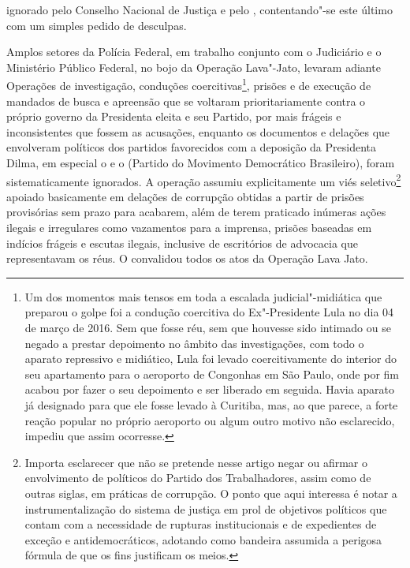 ignorado pelo Conselho Nacional de Justiça e pelo , contentando"-se
este último com um simples pedido de desculpas.

Amplos setores da Polícia Federal, em trabalho conjunto com o Judiciário
e o Ministério Público Federal, no bojo da Operação Lava"-Jato, levaram
adiante Operações de investigação, conduções coercitivas\footnote{Um dos
  momentos mais tensos em toda a escalada judicial"-midiática que
  preparou o golpe foi a condução coercitiva do Ex"-Presidente Lula no
  dia 04 de março de 2016. Sem que fosse réu, sem que houvesse sido
  intimado ou se negado a prestar depoimento no âmbito das
  investigações, com todo o aparato repressivo e midiático, Lula foi
  levado coercitivamente do interior do seu apartamento para o aeroporto
  de Congonhas em São Paulo, onde por fim acabou por fazer o seu
  depoimento e ser liberado em seguida. Havia aparato já designado para
  que ele fosse levado à Curitiba, mas, ao que parece, a forte reação
  popular no próprio aeroporto ou algum outro motivo não esclarecido,
  impediu que assim ocorresse.}, prisões e de execução de mandados de
busca e apreensão que se voltaram prioritariamente contra o próprio
governo da Presidenta eleita e seu Partido, por mais frágeis e
inconsistentes que fossem as acusações, enquanto os documentos e
delações que envolveram políticos dos partidos favorecidos com a
deposição da Presidenta Dilma, em especial o  e o  (Partido do
Movimento Democrático Brasileiro), foram sistematicamente ignorados. A
operação assumiu explicitamente um viés seletivo\footnote{Importa
  esclarecer que não se pretende nesse artigo negar ou afirmar o
  envolvimento de políticos do Partido dos Trabalhadores, assim como de
  outras siglas, em práticas de corrupção. O ponto que aqui interessa é
  notar a instrumentalização do sistema de justiça em prol de objetivos
  políticos que contam com a necessidade de rupturas institucionais e de
  expedientes de exceção e antidemocráticos, adotando como bandeira
  assumida a perigosa fórmula de que os fins justificam os meios.}
apoiado basicamente em delações de corrupção obtidas a partir de prisões
provisórias sem prazo para acabarem, além de terem praticado inúmeras
ações ilegais e irregulares como vazamentos para a imprensa, prisões
baseadas em indícios frágeis e escutas ilegais, inclusive de escritórios
de advocacia que representavam os réus. O  convalidou todos os atos
da Operação Lava Jato.


